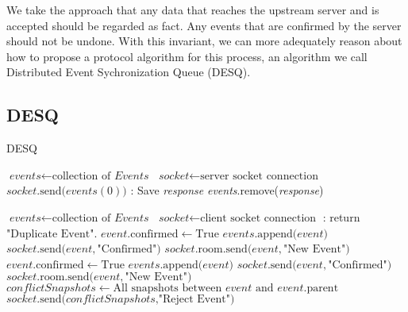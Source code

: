 We take the approach that any data that reaches the upstream server and is accepted should be regarded as fact. Any events that are confirmed by the server should not be undone. With this invariant, we can more adequately reason about how to propose a protocol algorithm for this process, an algorithm we call Distributed Event Sychronization Queue (DESQ).

\subsection{DESQ} 

\makeatletter
\def\BState{\State\hskip-\ALG@thistlm}
\makeatother

\begin{algorithm}
\caption{DESQ}\label{euclid}
\begin{algorithmic}[1]
\State $\textit{events} \gets \text{collection of }\textit{Events}$
\State $\textit{socket} \gets \text{server socket connection}$
\State $socket\text{.send(}events(0)\text{)}$
\EndWhile
{}:
\State Save \emph{response}
\State \emph{events}.remove(\emph{response})
\EndIf
\EndLoop
\EndProcedure
\end{algorithmic}
\begin{algorithmic}[1]
\State $\textit{events} \gets \text{collection of }\textit{Events}$
\State $\textit{socket} \gets \text{client socket connection}$
:
\State return $\text{"Duplicate Event"}$.
\EndIf
{}
\State $event\text{.confirmed} \gets \text{True}$
\State $events\text{.append(}event\text{)}$
\State $socket\text{.send(}event, \text{"Confirmed")}$
\State $socket\text{.room.send(}event, \text{"New Event")}$
\Else
{}
\State $event\text{.confirmed} \gets \text{True}$
\State $events\text{.append(}event\text{)}$
\State $socket\text{.send(}event, \text{"Confirmed")}$
\State $socket\text{.room.send(}event, \text{"New Event")}$
\Else
\State $conflictSnapshots \gets \text{All snapshots between }event\text{ and }event\text{.parent}$
\State $socket\text{.send(}conflictSnapshots\text{,"Reject Event")}$
\EndIf
\EndIf
\EndLoop
\EndProcedure
\end{algorithmic}
\end{algorithm}

